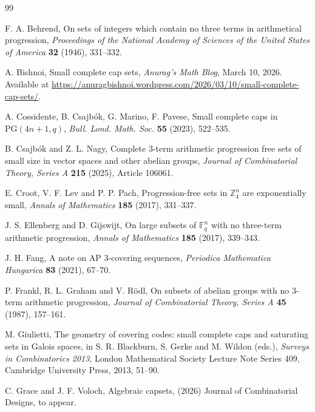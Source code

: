 \documentclass[11pt]{article}
\newcommand{\Z}{\mathbb Z}
\newcommand{\F}{\mathbb F}
\begin{document}
	
	\begin{thebibliography}{99}
		
		F. A. Behrend,
		On sets of integers which contain no three terms in arithmetical progression,
		\emph{Proceedings of the National Academy of Sciences of the United States of America} \textbf{32} (1946), 331--332.
		
		A. Bishnoi,
		Small complete cap sets,
		\emph{Anurag's Math Blog}, March 10, 2026.
		Available at
		\url{https://anuragbishnoi.wordpress.com/2026/03/10/small-complete-cap-sets/}.
		
		 A. Cossidente,  B. Csajb\'ok, G. Marino, F. Pavese,  Small complete caps in $\mathrm{PG}(4n+1,q)$, \emph{Bull. Lond. Math. Soc.} \textbf{55} (2023), 522--535.
		
		B. Csajb\'ok and Z. L. Nagy,
		Complete 3-term arithmetic progression free sets of small size in vector spaces and other abelian groups,
		\emph{Journal of Combinatorial Theory, Series A} \textbf{215} (2025), Article 106061.
		
		E. Croot, V. F. Lev and P. P. Pach,
		Progression-free sets in $\Z_4^n$ are exponentially small,
		\emph{Annals of Mathematics} \textbf{185} (2017), 331--337.
		
		J. S. Ellenberg and D. Gijswijt,
		On large subsets of $\F_q^n$ with no three-term arithmetic progression,
		\emph{Annals of Mathematics} \textbf{185} (2017), 339--343.
		
		J. H. Fang,
		A note on AP 3-covering sequences,
		\emph{Periodica Mathematica Hungarica} \textbf{83} (2021), 67--70.
		
		P. Frankl, R. L. Graham and V. R\"odl,
		On subsets of abelian groups with no 3-term arithmetic progression,
		\emph{Journal of Combinatorial Theory, Series A} \textbf{45} (1987), 157--161.
		
		M. Giulietti,
		The geometry of covering codes: small complete caps and saturating sets in Galois spaces,
		in S. R. Blackburn, S. Gerke and M. Wildon (eds.), \emph{Surveys in Combinatorics 2013}, London Mathematical Society Lecture Note Series 409, Cambridge University Press, 2013, 51--90.
		
		C. Grace and J. F. Voloch,
		Algebraic capsets, (2026) Journal of Combinatorial Designs, to appear. 
		

\end{thebibliography}
\end{document}
